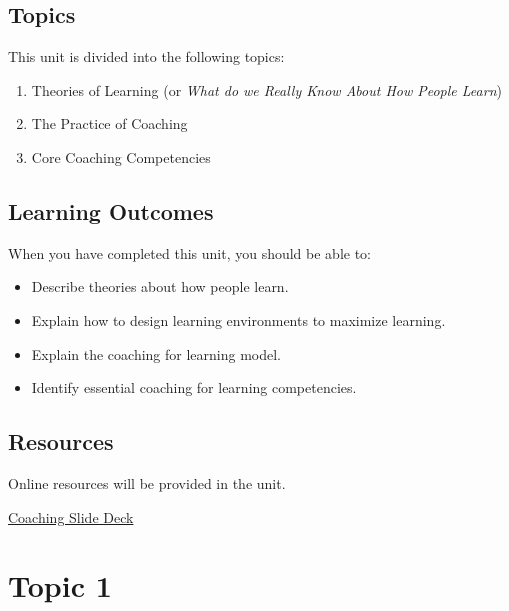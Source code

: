 \documentclass[
]{book}
\providecommand{\tightlist}{%
  \setlength{\itemsep}{0pt}\setlength{\parskip}{0pt}}
\begin{document}
\hypertarget{topics-2}{%
\subsection*{Topics}\label{topics-2}}

This unit is divided into the following topics:

\begin{enumerate}
\def\labelenumi{\arabic{enumi}.}
\tightlist
\item
  Theories of Learning (or \emph{What do we Really Know About How People Learn})
\item
  The Practice of Coaching
\item
  Core Coaching Competencies
\end{enumerate}

\hypertarget{learning-outcomes-2}{%
\subsection*{Learning Outcomes}\label{learning-outcomes-2}}

When you have completed this unit, you should be able to:

\begin{itemize}
\tightlist
\item
  Describe theories about how people learn.
\item
  Explain how to design learning environments to maximize learning.
\item
  Explain the coaching for learning model.
\item
  Identify essential coaching for learning competencies.
\end{itemize}

\hypertarget{resources-3}{%
\subsection*{Resources}\label{resources-3}}

Online resources will be provided in the unit.

\href{https://far.twu.ca/ldrs/663-202103/presentations/coaching\#/coaching-0}{Coaching Slide Deck}

\hypertarget{topic-1-1}{%
\section*{Topic 1}\label{topic-1-1}}
\end{document}
